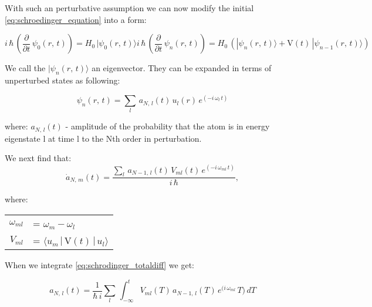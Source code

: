 \documentclass[12pt,twoside,a4paper]{article}
\numberwithin{equation}{subsection}
\numberwithin{figure}{subsection}
\newcommand{\ket}[1]{|#1\rangle}
\begin{document}
With such an perturbative assumption we can now modify the initial \ref{eq:schroedinger_equation} into a form:

\begin{subequations} \label{eq:schrodinger_modified}
  \begin{equation}   \label{eq:smodified_zero}
    i\,\hbar\,({\frac {\partial }{\partial t}}\,\psi_{0}(r, \,t)) = H_{0}\, \ket{\psi_{0}(r, \,t)}
  \end{equation}
  \begin{equation}   \label{eq:smodified_n}
    i\,\hbar\,({\frac {\partial }{\partial t}}\,\psi_{n}(r, \,t)) = H_{0}\,( \ket{\psi_{n}(r, \,t)} +
    \mathrm{V}(t)\,\ket{\psi_{n-1}(r, \,t)})
  \end{equation}
\end{subequations}

We call the $\ket{{\psi_{n}}(r, \,t)}$ an eigenvector. They can be expanded in terms of unperturbed states as following:

\begin{equation} \label{eq:schrodinger_unperturbed}
  {\psi_{n}}(r, \,t)=\sum_{l}\,{a_{N, \,l}}(t)\,{u_{l}}(r)\,e^{( - i\,{\omega_{l}}\,t)}
\end{equation}

where: $a_{N,\,l}(t)$ - amplitude of the probability that the atom is in energy eigenstate l at time l to the Nth order in
perturbation.


We next find that:
\begin{equation} \label{eq:schrodinger_totaldiff}
  \dot a_{N, \,m}(t) = \frac {\sum_{l} \, a_{N-1, \, l}(t) \, V_{ml}(t) \, e^{(-i\, \omega_{ml} \,t)}}{i \, \hbar},
\end{equation}


where: 

\begin{tabular}{ r l}
  $ \omega_{ml}$ &= $\omega_{m} - \omega_{l}$ \\
  $V_{ml}$ &= $\langle {u_{m}}\, | \,\mathrm{V}(t)\, | \,u_{l}\rangle $ \\
\end{tabular}

When we integrate \ref{eq:schrodinger_totaldiff} we get:

\begin{equation} \label{eq:stotaldiff_afterintegrate}
   a_{N, \,l}(t) = \frac{1}{\hbar \, i} \sum_{l}\,\int_{ -\infty }^{t} V_{ml} (T)\, a_{N-1, \,l}(T)\,e^{(i\,\omega_{ml}}\,T)\,dT
\end{equation}
\end{document}
